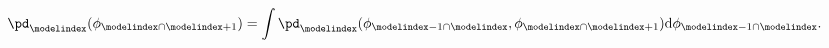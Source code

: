 \begin{gather}
  \pd_{\modelindex}(\phi_{\modelindex \cap \modelindex + 1}) =
    \int
    \pd_{\modelindex}(\phi_{\modelindex - 1 \cap \modelindex}, \phi_{\modelindex \cap \modelindex + 1})
    \text{d}\phi_{\modelindex - 1 \cap \modelindex}.
  \label{eqn:M-model-linear-pooling-component-def}
\end{gather}